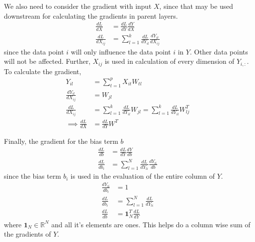 \documentclass[../../deep_learning_notes.tex]{subfiles}
\begin{document}
We also need to consider the gradient with input $X$, since that may be used downstream for calculating the gradients in parent layers.
\begin{align*}
    \frac{dL}{dX} &= \frac{dL}{dY} \frac{dY}{dX}\\
    \frac{dL}{dX_{ij}} &= \sum_{l=1}^{k} \frac{dL}{dY_{il}} \frac{dY_{il}}{dX_{ij}}
\end{align*}
since the data point $i$ will only influence the data point $i$ in $Y$. Other data points will not be affected. Further, $X_{ij}$ is used in calculation of every dimension of $Y_{i,:}$. To calculate the gradient,
\begin{align*}
    Y_{il} &= \sum_{t=1}^{p} X_{it}W_{tl}\\
    \frac{dY_{il}}{dX_{ij}} &= W_{jl}\\
    \frac{dL}{dX_{ij}} &= \sum_{l=1}^{k} \frac{dL}{dY_{il}}W_{jl}
    = \sum_{l=1}^{k} \frac{dL}{dY_{il}} W_{lj}^{T}\\
    \implies \frac{dL}{dX} &= \frac{dL}{dY} W^{T}
\end{align*}

Finally, the gradient for the bias term $b$
\begin{align*}
    \frac{dL}{db} &= \frac{dL}{dY} \frac{dY}{db}\\
    \frac{dL}{db_{i}} &= \sum_{l=1}^{N} \frac{dL}{dY_{li}} \frac{dY_{li}}{db}
\end{align*}
since the bias term $b_{i}$ is used in the evaluation of the entire column of $Y$.
\begin{align*}
    \frac{dY_{li}}{db_{i}} &= 1\\
    \frac{dL}{db_{i}} &= \sum_{l=1}^{N} \frac{dL}{dY_{li}}\\
    \frac{dL}{db} &= \bm{1}_{N}^{T}\frac{dL}{dY}
\end{align*}
where $\bm{1}_{N} \in \mathbb{R}^{N}$ and all it's elements are ones. This helps do a column wise sum of the gradients of $Y$.

\end{document}
